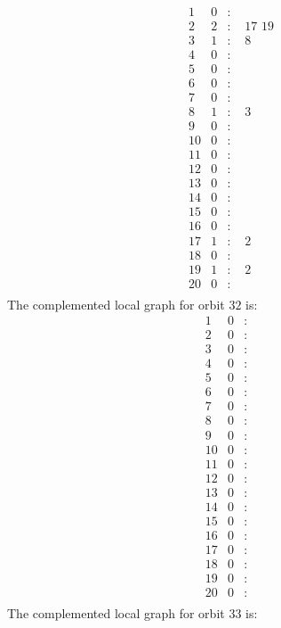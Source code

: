 \documentclass[12pt]{article}
\begin{document}
\begin{equation*}
\begin{array}{rrcl}
1&0&:&\\
2&2&:&\,\,17\,\,19\\
3&1&:&\,\,8\\
4&0&:&\\
5&0&:&\\
6&0&:&\\
7&0&:&\\
8&1&:&\,\,3\\
9&0&:&\\
10&0&:&\\
11&0&:&\\
12&0&:&\\
13&0&:&\\
14&0&:&\\
15&0&:&\\
16&0&:&\\
17&1&:&\,\,2\\
18&0&:&\\
19&1&:&\,\,2\\
20&0&:&\\
\end{array}
\end{equation*}
The complemented local graph for orbit $32$ is:
\begin{equation*}
\begin{array}{rrcl}
1&0&:&\\
2&0&:&\\
3&0&:&\\
4&0&:&\\
5&0&:&\\
6&0&:&\\
7&0&:&\\
8&0&:&\\
9&0&:&\\
10&0&:&\\
11&0&:&\\
12&0&:&\\
13&0&:&\\
14&0&:&\\
15&0&:&\\
16&0&:&\\
17&0&:&\\
18&0&:&\\
19&0&:&\\
20&0&:&\\
\end{array}
\end{equation*}
The complemented local graph for orbit $33$ is:
\end{document}
